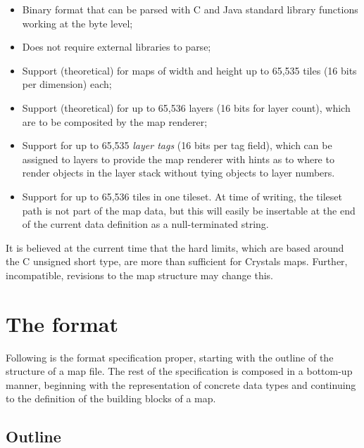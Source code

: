 \documentclass [12pt,a4paper]{article}
\begin{document}
\begin{itemize}

  \item Binary format that can be parsed with C and Java standard
    library functions working at the byte level;

  \item Does not require external libraries to parse;

  \item Support (theoretical) for maps of width and height up to 65,535
    tiles (16 bits per dimension) each;

  \item Support (theoretical) for up to 65,536 layers (16 bits for
    layer count), which are to be composited by the map renderer;

  \item Support for up to 65,535 \emph{layer tags} (16 bits per tag
    field), which can be assigned to layers to provide the map
    renderer with hints as to where to render objects in the layer
    stack without tying objects to layer numbers.

  \item Support for up to 65,536 tiles in one tileset.  At time of
    writing, the tileset path is not part of the map data, but this
    will easily be insertable at the end of the current data
    definition as a null-terminated string.

\end{itemize}

It is believed at the current time that the hard limits, which are
based around the C unsigned short type, are more than sufficient for
Crystals maps.  Further, incompatible, revisions to the map structure
may change this.


\section{The format}

Following is the format specification proper, starting with the
outline of the structure of a map file.  The rest of the specification
is composed in a bottom-up manner, beginning with the representation
of concrete data types and continuing to the definition of the
building blocks of a map.


\subsection {Outline}
\end{document}
